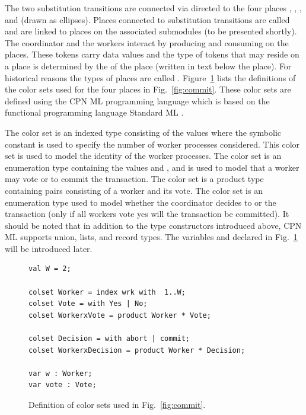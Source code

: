 The two substitution transitions are connected via directed
 to the four places ,
, , and  (drawn
as ellipses). Places connected to substitution transitions are called
 and are linked to  places on the
associated submodules (to be presented shortly). The coordinator and
the workers interact by producing and consuming  on
the places. These tokens carry data values and the type of tokens that
may reside on a place is determined by the  of the place
(written in text below the place). For historical reasons the types of
places are called . Figure~\ref{fig:coloursets}
lists the definitions of the color sets used for the four places in
Fig.~\ref{fig:commit}. These color sets are defined using the CPN ML
programming language which is based on the functional programming language
Standard ML \cite{X}.

The  color set is an indexed type consisting of the
values  where the symbolic constant
 is used to specify the number of worker processes
considered. This color set is used to model the identity of the worker
processes. The color set  is an enumeration type
containing the values  and , and is used to
model that a worker may vote  or  to commit
the transaction. The color set  is a product type
containing pairs consisting of a worker and its vote. The color set
 is an enumeration type used to model whether the
coordinator decides to  or  the
transaction (only if all workers vote yes will the transaction be
committed). It should be noted that in addition to the type
constructors introduced above, CPN ML supports union, lists, and
record types. The variables  and  declared in
Fig.~\ref{fig:coloursets} will be introduced later.

\begin{figure}[]
\begin{verbatim}
val W = 2;

colset Worker = index wrk with  1..W;
colset Vote = with Yes | No;
colset WorkerxVote = product Worker * Vote;

colset Decision = with abort | commit;
colset WorkerxDecision = product Worker * Decision;

var w : Worker;
var vote : Vote;
\end{verbatim}
\caption{Definition of color sets used in Fig.~\ref{fig:commit}.}
\label{fig:coloursets}
\end{figure}



